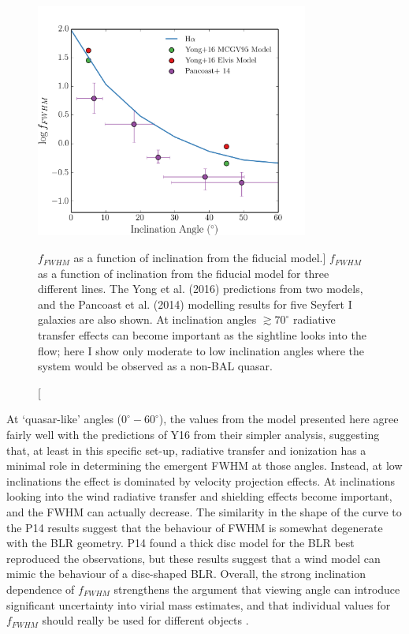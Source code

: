 \begin{figure}
\centering
\includegraphics[width=0.8\textwidth]{figures/06-agnpaper/f_factor.png}
\caption
[$f_{FWHM}$ as a function of inclination from the fiducial model.]
{
$f_{FWHM}$ as a function of inclination from the fiducial model
for three different lines. The Yong et al. (2016) 
predictions from two models, and the Pancoast et al. (2014) modelling results
for five Seyfert I galaxies are also shown. At inclination angles $\gtrsim 70^\circ$
radiative transfer effects can become important as the sightline looks into the flow; here
I show only moderate to low inclination angles where the system would be observed as a
non-BAL quasar.
}
\label{fig:FWHM}
\end{figure}

At `quasar-like' angles ($0^\circ-60^\circ$), the values from the model presented here 
agree fairly well with the predictions
of Y16 from their simpler analysis, suggesting that,
at least in this specific set-up, 
radiative transfer and ionization has a minimal role in determining
the emergent FWHM at those angles. Instead, at low inclinations 
the effect is dominated by velocity projection
effects. At inclinations looking into the wind radiative transfer
and shielding effects become important, and the FWHM can actually
decrease. The similarity in the shape of the curve to the P14 results suggest 
that the behaviour of FWHM is somewhat degenerate with the BLR
geometry. P14 found a thick disc model for the BLR best reproduced
the observations, but these results suggest that a wind model can mimic 
the behaviour of a disc-shaped BLR. Overall, the strong inclination dependence
of $f_{FWHM}$ strengthens the argument that viewing angle can introduce
significant uncertainty into virial mass estimates, and that individual
values for $f_{FWHM}$ should really be used for different objects
\citep[e.g.][]{decarli2008,kollatschny2011,pancoast2014a,pancoast2014b,shenho2014,brotherton2015,yong2016}.


